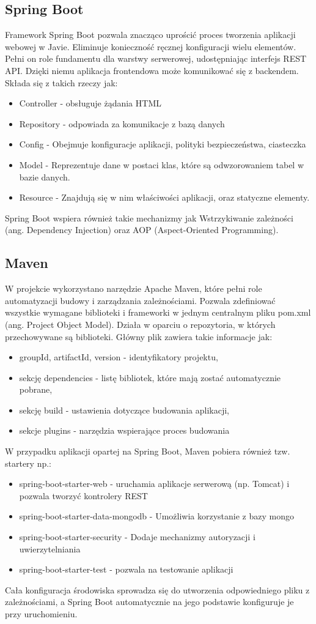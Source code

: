 \subsection*{Spring Boot}
Framework Spring Boot pozwala znacząco uprościć proces tworzenia aplikacji webowej w Javie. Eliminuje konieczność ręcznej konfiguracji wielu elementów. Pełni on role fundamentu dla warstwy serwerowej, udostępniając interfejs REST API. Dzięki niemu aplikacja frontendowa może komunikować się z backendem. Składa się z takich rzeczy jak:
\begin{itemize}
	\item Controller - obsługuje żądania HTML
	\item Repository - odpowiada za komunikacje z bazą danych
	\item Config - Obejmuje konfiguracje aplikacji, polityki bezpieczeństwa, ciasteczka
	\item Model - Reprezentuje dane w postaci klas, które są odwzorowaniem tabel w bazie danych.
	\item Resource - Znajdują się w nim właściwości aplikacji, oraz statyczne elementy.
\end{itemize}
Spring Boot wspiera również takie mechanizmy jak Wstrzykiwanie zależności (ang. Dependency Injection) oraz AOP (Aspect-Oriented Programming).
\subsection*{Maven}
W projekcie wykorzystano narzędzie Apache Maven, które pełni role automatyzacji budowy i zarządzania zależnościami. Pozwala zdefiniować wszystkie wymagane biblioteki i frameworki w jednym centralnym pliku pom.xml (ang. Project Object Model). Działa w oparciu o repozytoria, w których przechowywane są biblioteki. Główny plik zawiera takie informacje jak:
\begin{itemize}
	\item groupId, artifactId, version - identyfikatory projektu,
	\item sekcję dependencies - listę bibliotek, które mają zostać automatycznie pobrane,
	\item sekcję build - ustawienia dotyczące budowania aplikacji,
	\item sekcje plugins - narzędzia wspierające proces budowania
\end{itemize}
W przypadku aplikacji opartej na Spring Boot, Maven pobiera również tzw. startery np.:
\begin{itemize}
	\item spring-boot-starter-web - uruchamia aplikacje serwerową (np. Tomcat) i pozwala tworzyć kontrolery REST
	\item spring-boot-starter-data-mongodb - Umożliwia korzystanie z bazy mongo
	\item spring-boot-starter-security - Dodaje mechanizmy autoryzacji i uwierzytelniania
	\item spring-boot-starter-test - pozwala na testowanie aplikacji
\end{itemize}
Cała konfiguracja środowiska sprowadza się do utworzenia odpowiedniego pliku z zależnościami, a Spring Boot automatycznie na jego podstawie konfiguruje je przy uruchomieniu.


